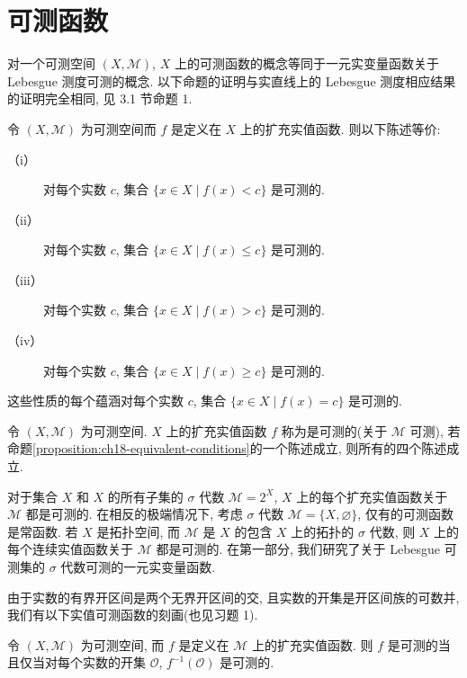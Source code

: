 \documentclass[../../main.tex]{subfiles}
\begin{document}
\section{可测函数}\label{section:ch18-measurable-functions}

对一个可测空间 $(X,\mathcal{M})$, $X$ 上的可测函数的概念等同于一元实变量函数关于 Lebesgue 测度可测的概念. 以下命题的证明与实直线上的 Lebesgue 测度相应结果的证明完全相同, 见 3.1 节命题 1.

\begin{proposition}\label{proposition:ch18-equivalent-conditions}
令 $(X,\mathcal{M})$ 为可测空间而 $f$ 是定义在 $X$ 上的扩充实值函数. 则以下陈述等价:
\begin{description}
\item[（i）] 对每个实数 $c$, 集合 $\{x\in X\mid f(x)<c\}$ 是可测的.
\item[（ii）] 对每个实数 $c$, 集合 $\{x\in X\mid f(x)\leqslant c\}$ 是可测的.
\item[（iii）] 对每个实数 $c$, 集合 $\{x\in X\mid f(x)>c\}$ 是可测的.
\item[（iv）] 对每个实数 $c$, 集合 $\{x\in X\mid f(x)\geqslant c\}$ 是可测的.
\end{description}
这些性质的每个蕴涵对每个实数 $c$, 集合 $\{x\in X\mid f(x)=c\}$ 是可测的.
\end{proposition}

\begin{definition}[可测函数]\label{definition:ch18-measurable-function}
令 $(X,\mathcal{M})$ 为可测空间. $X$ 上的扩充实值函数 $f$ 称为是可测的(关于 $\mathcal{M}$ 可测), 若命题\cref{proposition:ch18-equivalent-conditions}的一个陈述成立, 则所有的四个陈述成立.
\end{definition}

对于集合 $X$ 和 $X$ 的所有子集的 $\sigma$ 代数 $\mathcal{M}=2^{X}$, $X$ 上的每个扩充实值函数关于 $\mathcal{M}$ 都是可测的. 在相反的极端情况下, 考虑 $\sigma$ 代数 $\mathcal{M}=\{X,\varnothing\}$, 仅有的可测函数是常函数. 若 $X$ 是拓扑空间, 而 $\mathcal{M}$ 是 $X$ 的包含 $X$ 上的拓扑的 $\sigma$ 代数, 则 $X$ 上的每个连续实值函数关于 $\mathcal{M}$ 都是可测的. 在第一部分, 我们研究了关于 Lebesgue 可测集的 $\sigma$ 代数可测的一元实变量函数.

由于实数的有界开区间是两个无界开区间的交, 且实数的开集是开区间族的可数并, 我们有以下实值可测函数的刻画(也见习题 1).

\begin{proposition}\label{proposition:ch18-open-preimage}
令 $(X,\mathcal{M})$ 为可测空间, 而 $f$ 是定义在 $\mathcal{M}$ 上的扩充实值函数. 则 $f$ 是可测的当且仅当对每个实数的开集 $\mathcal{O}$, $f^{-1}(\mathcal{O})$ 是可测的.
\end{proposition}
\end{document}
